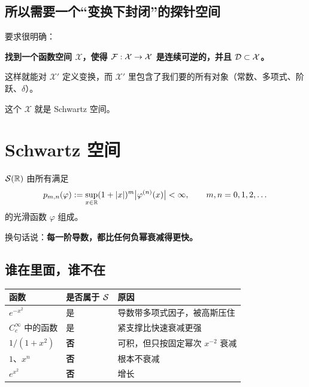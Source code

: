 \subsection{所以需要一个“变换下封闭”的探针空间}

要求很明确：

\begin{center}
\textbf{找到一个函数空间 $\mathcal{X}$，使得 $\mathcal{F}:\mathcal{X}\to\mathcal{X}$ 是连续可逆的，并且 $\mathcal{D}\subset\mathcal{X}$。}
\end{center}

这样就能对 $\mathcal{X}'$ 定义变换，而 $\mathcal{X}'$ 里包含了我们要的所有对象（常数、多项式、阶跃、$\delta$）。

这个 $\mathcal{X}$ 就是 Schwartz 空间。

\section{Schwartz 空间}

\begin{defn}[Schwartz 空间]\label{def:S}
$\mathcal{S}(\mathbb{R})$ 由所有满足
\begin{equation}
p_{m,n}(\varphi):=\sup_{x\in\mathbb{R}}(1+|x|)^{m}\big|\varphi^{(n)}(x)\big|<\infty,
\qquad m,n=0,1,2,\dots
\end{equation}
的光滑函数 $\varphi$ 组成。
\end{defn}

换句话说：\textbf{每一阶导数，都比任何负幂衰减得更快。}

\subsection{谁在里面，谁不在}

\begin{center}
\small
\renewcommand{\arraystretch}{1.4}
\begin{tabularx}{\textwidth}{@{}L{4.2cm}L{2.0cm}Y@{}}
\toprule
函数 & 是否属于 $\mathcal{S}$ & 原因 \\
\midrule
$e^{-x^{2}}$ & 是 & 导数带多项式因子，被高斯压住 \\
$C_c^{\infty}$ 中的函数 & 是 & 紧支撑比快速衰减更强 \\
$1/(1+x^{2})$ & \textbf{否} & 可积，但只按固定幂次 $x^{-2}$ 衰减 \\
$1$、$x^{n}$ & \textbf{否} & 根本不衰减 \\
$e^{x^{2}}$ & \textbf{否} & 增长 \\
\bottomrule
\end{tabularx}
\end{center}

